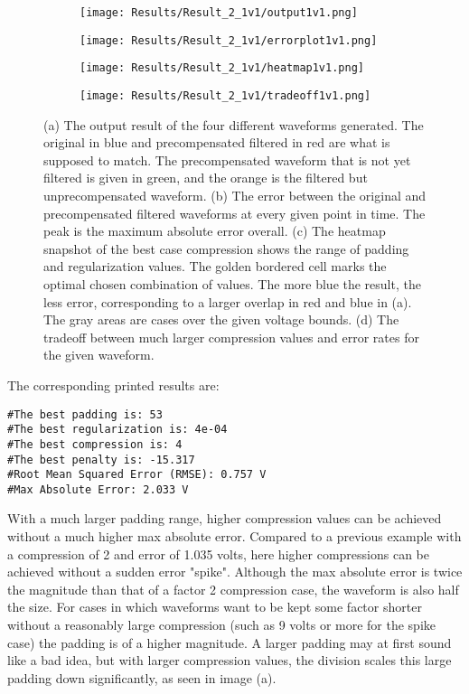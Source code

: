 \documentclass[11pt, a4paper]{article}
\theoremstyle{definition}
\numberwithin{equation}{section}
\begin{document}
\begin{figure}[hbt!]
\centering
\begin{subfigure}{.45\linewidth}
  \centering
  \texttt{[image: Results/Result\_2\_1v1/output1v1.png]}
  \subcaption{}
  \label{output1v1}
\end{subfigure}
\quad
\begin{subfigure}{.45\linewidth}
  \centering
  \texttt{[image: Results/Result\_2\_1v1/errorplot1v1.png]}
  \subcaption{}
  \label{errorplot1v1}
\end{subfigure}
\begin{subfigure}{.45\linewidth}
  \centering
  \texttt{[image: Results/Result\_2\_1v1/heatmap1v1.png]}
  \subcaption{}
  \label{heatmap1v1}
\end{subfigure}
\quad
\begin{subfigure}{.45\linewidth}
  \centering
  \texttt{[image: Results/Result\_2\_1v1/tradeoff1v1.png]}
  \caption{}
  \label{tradeoff1v1}
\end{subfigure}
\caption{(a) The output result of the four different waveforms generated. The original in blue and precompensated filtered in red are what is supposed to match. The precompensated waveform that is not yet filtered is given in green, and the orange is the filtered but unprecompensated waveform. (b) The error between the original and precompensated filtered waveforms at every given point in time. The peak is the maximum absolute error overall. (c) The heatmap snapshot of the best case compression shows the range of padding and regularization values. The golden bordered cell marks the optimal chosen combination of values. The more blue the result, the less error, corresponding to a larger overlap in red and blue in (a). The gray areas are cases over the given voltage bounds. (d) The tradeoff between much larger compression values and error rates for the given waveform.}
\label{fig:3v1}
\end{figure}

The corresponding printed results are:

\begin{verbatim}
#The best padding is: 53
#The best regularization is: 4e-04
#The best compression is: 4
#The best penalty is: -15.317
#Root Mean Squared Error (RMSE): 0.757 V
#Max Absolute Error: 2.033 V
\end{verbatim}

With a much larger padding range, higher compression values can be achieved without a much higher max absolute error. Compared to a previous example with a compression of 2 and error of 1.035 volts, here higher compressions can be achieved without a sudden error "spike". Although the max absolute error is twice the magnitude than that of a factor 2 compression case, the waveform is also half the size. For cases in which waveforms want to be kept some factor shorter without a reasonably large compression (such as 9 volts or more for the spike case) the padding is of a higher magnitude. A larger padding may at first sound like a bad idea, but with larger compression values, the division scales this large padding down significantly, as seen in image (a).
\end{document}
